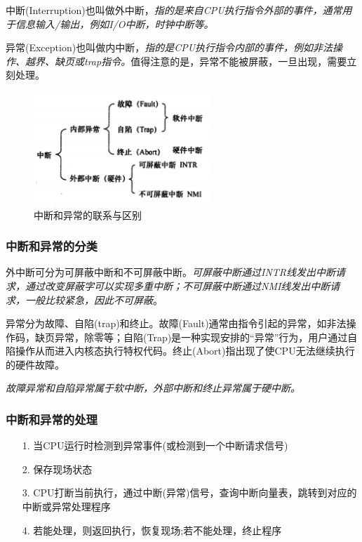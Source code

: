     中断(Interruption)也叫做外中断，\emph{指的是来自CPU执行指令外部的事件，通常用于信息输入/输出，例如I/O中断，时钟中断等。}

    异常(Exception)也叫做内中断，\emph{指的是CPU执行指令内部的事件，例如非法操作、越界、缺页或trap指令。}值得注意的是，{\color{red}异常不能被屏蔽，一旦出现，需要立刻处理。}

\begin{figure}[!htbp]
    \centering
    \includegraphics[width=0.6\textwidth]{image/chapter01/异常和中断区分.png}
    \caption{中断和异常的联系与区别}
\end{figure}

\subsubsection{中断和异常的分类}

    外中断可分为可屏蔽中断和不可屏蔽中断。\emph{可屏蔽中断通过INTR线发出中断请求，通过改变屏蔽字可以实现多重中断；不可屏蔽中断通过NMI线发出中断请求，一般比较紧急，因此不可屏蔽}。

    异常分为故障、自陷(trap)和终止。故障(Fault)通常由指令引起的异常，如非法操作码，缺页异常，除零等；自陷(Trap)是一种实现安排的“异常”行为，用户通过自陷操作从而进入内核态执行特权代码。终止(Abort)指出现了使CPU无法继续执行的硬件故障。

    \emph{故障异常和自陷异常属于软中断，外部中断和终止异常属于硬中断。}

\subsubsection{中断和异常的处理}

\begin{itemize}
    \item [1.] 当CPU运行时检测到异常事件(或检测到一个中断请求信号)
    \item [2.] 保存现场状态
    \item [3.] CPU打断当前执行，通过中断(异常)信号，查询中断向量表，跳转到对应的中断或异常处理程序
    \item [4.] 若能处理，则返回执行，恢复现场;若不能处理，终止程序
\end{itemize}

